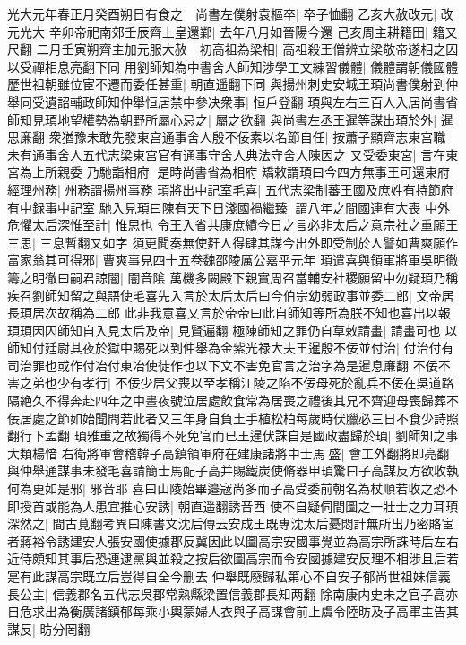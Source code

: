 光大元年春正月癸酉朔日有食之　尚書左僕射袁樞卒|{
	卒子恤翻}
乙亥大赦改元|{
	改元光大}
辛卯帝祀南郊壬辰齊上皇還鄴|{
	去年八月如晉陽今還}
己亥周主耕籍田|{
	籍又尺翻}
二月壬寅朔齊主加元服大赦　初高祖為梁相|{
	高祖殺王僧辨立梁敬帝遂相之因以受禪相息亮翻下同}
用劉師知為中書舍人師知涉學工文練習儀體|{
	儀體謂朝儀國體}
歷世祖朝雖位宦不遷而委任甚重|{
	朝直遥翻下同}
與揚州刺史安城王頊尚書僕射到仲舉同受遺詔輔政師知仲舉恒居禁中參决衆事|{
	恒戶登翻}
頊與左右三百人入居尚書省師知見頊地望權勢為朝野所屬心忌之|{
	屬之欲翻}
與尚書左丞王暹等謀出頊於外|{
	暹思亷翻}
衆猶豫未敢先發東宫通事舍人殷不佞素以名節自任|{
	按蕭子顯齊志東宫職未有通事舍人五代志梁東宫官有通事守舍人典法守舍人陳因之}
又受委東宮|{
	言在東宮為上所親委}
乃馳詣相府|{
	是時尚書省為相府}
矯敕謂頊曰今四方無事王可還東府經理州務|{
	州務謂揚州事務}
頊將出中記室毛喜|{
	五代志梁制蕃王國及庶姓有持節府有中録事中記室}
馳入見頊曰陳有天下日淺國禍繼臻|{
	謂八年之間國連有大喪}
中外危懼太后深惟至計|{
	惟思也}
令王入省共康庶績今日之言必非太后之意宗社之重願王三思|{
	三息暫翻又如字}
須更聞奏無使姧人得肆其謀今出外即受制於人譬如曹爽願作富家翁其可得邪|{
	曹爽事見四十五卷魏邵陵厲公嘉平元年}
頊遣喜與領軍將軍吳明徹籌之明徹曰嗣君諒闇|{
	闇音隂}
萬機多闕殿下親實周召當輔安社稷願留中勿疑頊乃稱疾召劉師知留之與語使毛喜先入言於太后太后曰今伯宗幼弱政事並委二郎|{
	文帝居長頊居次故稱為二郎}
此非我意喜又言於帝帝曰此自師知等所為朕不知也喜出以報頊頊因囚師知自入見太后及帝|{
	見賢遍翻}
極陳師知之罪仍自草敕請畫|{
	請畫可也}
以師知付廷尉其夜於獄中賜死以到仲舉為金紫光禄大夫王暹殷不佞並付治|{
	付治付有司治罪也或作付冶付東冶使徒作也以下文不害免官言之治字為是暹息亷翻}
不佞不害之弟也少有孝行|{
	不佞少居父喪以至孝稱江陵之陷不佞母死於亂兵不佞在吳道路隔絶久不得奔赴四年之中晝夜號泣居處飲食常為居喪之禮後其兄不齊迎母喪歸葬不佞居處之節如始聞問若此者又三年身自負土手植松柏每歲時伏臘必三日不食少詩照翻行下孟翻}
頊雅重之故獨得不死免官而已王暹伏誅自是國政盡歸於頊|{
	劉師知之事大類楊愔}
右衛將軍會稽韓子高鎮領軍府在建康諸將中士馬盛|{
	會工外翻將即亮翻}
與仲舉通謀事未發毛喜請簡士馬配子高并賜鐵炭使脩器甲頊驚曰子高謀反方欲收執何為更如是邪|{
	邪音耶}
喜曰山陵始畢邉宼尚多而子高受委前朝名為杖順若收之恐不即授首或能為人患宜推心安誘|{
	朝直遥翻誘音酉}
使不自疑伺間圖之一壯士之力耳頊深然之|{
	間古莧翻考異曰陳書文沈后傳云安成王既專沈太后憂悶計無所出乃密賂宦者蔣裕令誘建安人張安國使據郡反冀因此以圖高宗安國事覺並為高宗所誅時后左右近侍頗知其事后恐連逮黨與並殺之按后欲圖高宗而令安國據建安反理不相涉且后若寔有此謀高宗既立后豈得自全今删去}
仲舉既廢歸私第心不自安子郁尚世祖妹信義長公主|{
	信義郡名五代志吳郡常熟縣梁置信義郡長知两翻}
除南康内史未之官子高亦自危求出為衡廣諸鎮郁每乘小輿蒙婦人衣與子高謀會前上虞令陸昉及子高軍主告其謀反|{
	昉分罔翻}
